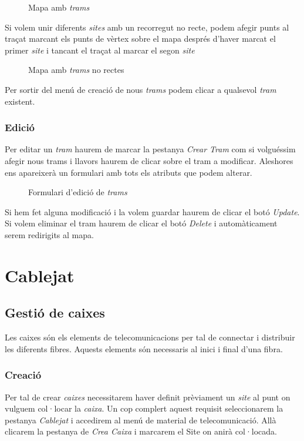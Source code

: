 \documentclass[a4paper]{article}
\begin{document}
	\begin{figure}[H]
		\centering
		\caption{Mapa amb \emph{trams}}
	\end{figure}
	
	Si volem unir diferents \emph{sites} amb un recorregut no recte, podem afegir punts al traçat marcant els punts de vèrtex sobre el mapa després d'haver marcat el primer \emph{site} i tancant el traçat al marcar el segon \emph{site}
	
	\begin{figure}[H]
		\centering
		\caption{Mapa amb \emph{trams} no rectes}
	\end{figure}

	Per sortir del menú de creació de nous \emph{trams} podem clicar a qualsevol \emph{tram} existent.
	
	\subsubsection{Edició}
	Per editar un \emph{tram} haurem de marcar la pestanya \emph{Crear Tram} com si volguéssim afegir nous trams i llavors haurem de clicar sobre el tram a modificar. Aleshores ens apareixerà un formulari amb tots els atributs que podem alterar.
	
	\begin{figure}[H]
		\centering
		\caption{Formulari d'edició de \emph{trams}}
	\end{figure}

	Si hem fet alguna modificació i la volem guardar haurem de clicar el botó \emph{Update}.
	Si volem eliminar el tram haurem de clicar el botó \emph{Delete} i automàticament serem redirigits al mapa.
	\section{Cablejat}
	\subsection{Gestió de caixes}
	Les caixes són els elements de telecomunicacions per tal de connectar i distribuir les diferents fibres. Aquests elements són necessaris al inici i final d'una fibra.
	
	\subsubsection{Creació}
	Per tal de crear \emph{caixes} necessitarem haver definit prèviament un \emph{site} al punt on vulguem col·locar la \emph{caixa}. Un cop complert aquest requisit seleccionarem la pestanya \emph{Cablejat} i accedirem al menú de material de telecomunicació. Allà clicarem la pestanya de \emph{Crea Caixa} i marcarem el Site on anirà col·locada.
	
\end{document}
